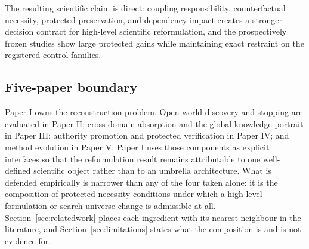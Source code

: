 The resulting scientific claim is direct: coupling responsibility, counterfactual necessity, protected preservation, and dependency impact creates a stronger decision contract for high-level scientific reformulation, and the prospectively frozen studies show large protected gains while maintaining exact restraint on the registered control families.

\subsection{Five-paper boundary}

Paper I owns the reconstruction problem. Open-world discovery and stopping are evaluated in Paper II; cross-domain absorption and the global knowledge portrait in Paper III; authority promotion and protected verification in Paper IV; and method evolution in Paper V. Paper I uses those components as explicit interfaces so that the reformulation result remains attributable to one well-defined scientific object rather than to an umbrella architecture.
What is defended empirically is narrower than any of the four taken alone: it is the composition of protected necessity conditions under which a high-level formulation or search-universe change is admissible at all. Section~\ref{sec:relatedwork} places each ingredient with its nearest neighbour in the literature, and Section~\ref{sec:limitations} states what the composition is and is not evidence for.
